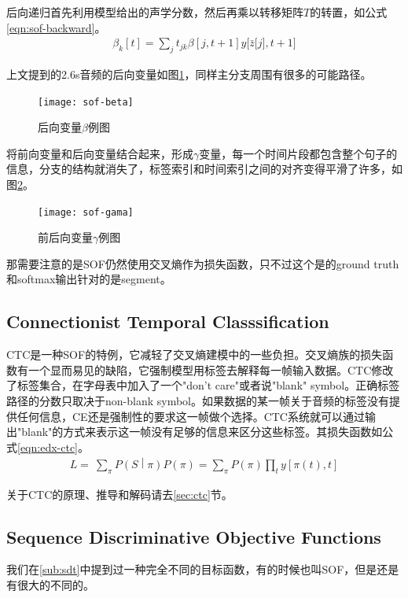 {后向递归首先利用模型给出的声学分数，然后再乘以转移矩阵$T$的转置，如公式\ref{eqn:sof-backward}。
\begin{align}
\label{eqn:sof-backward}
	\beta_{k}\left\lbrack t \right\rbrack = \sum_{j}^{}{t_{jk}\beta\left\lbrack j,t + 1 \right\rbrack}y\lbrack \bar{z}\lbrack j\rbrack,t + 1\rbrack
\end{align}

上文提到的2.6s音频的后向变量如图\ref{fig:sof-beta}，同样主分支周围有很多的可能路径。
\begin{figure}[htbp]
  \centering
  \texttt{[image: sof-beta]}
  \caption{后向变量$\beta$例图 \label{fig:sof-beta}}
\end{figure}

将前向变量和后向变量结合起来，形成$\gamma$变量，每一个时间片段都包含整个句子的信息，分支的结构就消失了，标签索引和时间索引之间的对齐变得平滑了许多，如图\ref{fig:sof-gama}。
\begin{figure}[htbp]
  \centering
  \texttt{[image: sof-gama]}
  \caption{前后向变量$\gamma$例图 \label{fig:sof-gama}}
\end{figure}

那需要注意的是SOF仍然使用交叉熵作为损失函数，只不过这个是的ground truth和softmax输出针对的是segment。

\subsection{Connectionist Temporal Classsification}
CTC是一种SOF的特例，它减轻了交叉熵建模中的一些负担。交叉熵族的损失函数有一个显而易见的缺陷，它强制模型用标签去解释每一帧输入数据。CTC修改了标签集合，在字母表中加入了一个"don't care"或者说"blank" symbol。正确标签路径的分数只取决于non-blank symbol。如果数据的某一帧关于音频的标签没有提供任何信息，CE还是强制性的要求这一帧做个选择。CTC系统就可以通过输出"blank"的方式来表示这一帧没有足够的信息来区分这些标签。其损失函数如公式\ref{eqn:edx-ctc}。
\begin{align}
\label{eqn:edx-ctc}
	L = \ \sum_{\pi}^{}{P\left( S \middle| \pi \right)P\left( \pi \right) = \sum_{\pi}^{}{P\left( \pi \right)\prod_{t}^{}{y\left\lbrack \pi\left( t \right),t \right\rbrack}}}
\end{align}

关于CTC的原理、推导和解码请去\ref{sec:ctc}节。

\subsection{Sequence Discriminative Objective Functions}
我们在\ref{sub:sdt}中提到过一种完全不同的目标函数，有的时候也叫SOF，但是还是有很大的不同的。

}

